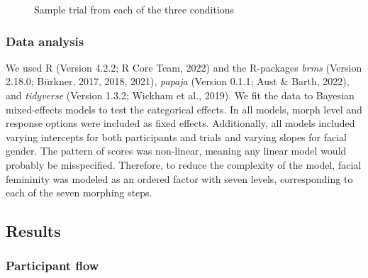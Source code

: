 \documentclass[
  man,
  longtable,
  nolmodern,
  notxfonts,
  notimes,
  colorlinks=true,linkcolor=blue,citecolor=blue,urlcolor=blue]{apa7}
\begin{document}
\begin{figure}

\caption{\label{fig-exp2-trial}Sample trial from each of the three
conditions}


\end{figure}%

\subsubsection{Data analysis}\label{data-analysis}

We used R (Version 4.2.2; R Core Team, 2022) and the R-packages
\emph{brms} (Version 2.18.0; Bürkner, 2017, 2018, 2021), \emph{papaja}
(Version 0.1.1; Aust \& Barth, 2022), and \emph{tidyverse} (Version
1.3.2; Wickham et al., 2019). We fit the data to Bayesian mixed-effects
models to test the categorical effects. In all models, morph level and
response options were included as fixed effects. Additionally, all
models included varying intercepts for both participants and trials and
varying slopes for facial gender. The pattern of scores was non-linear,
meaning any linear model would probably be misspecified. Therefore, to
reduce the complexity of the model, facial femininity was modeled as an
ordered factor with seven levels, corresponding to each of the seven
morphing steps.

\subsection{Results}\label{results}

\subsubsection{Participant flow}\label{participant-flow}
\end{document}
